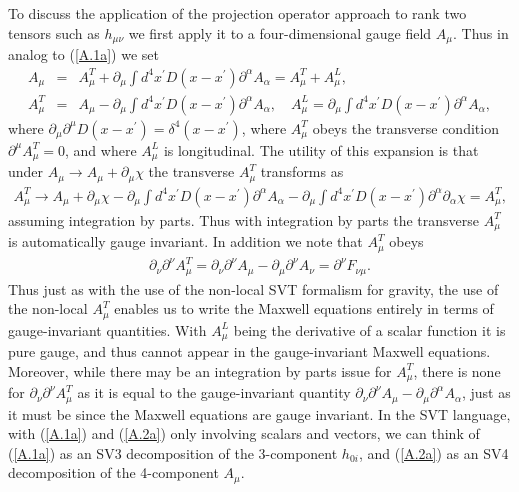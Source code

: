 \documentclass[aps,onecolumn,10pt]{revtex4}
\numberwithin{equation}{section}
\numberwithin{equation}{section}
\begin{document}
To discuss the application of the projection operator approach to rank two tensors such as $h_{\mu\nu}$ we first apply it to a four-dimensional gauge field $A_{\mu}$. Thus in analog to (\ref{A.1a}) we set
%
\begin{eqnarray}
A_{\mu}&=&A^T_{\mu}+\partial_{\mu}\int d^4x^{\prime}D(x-x^{\prime})\partial^{\alpha}A_{\alpha}=A^T_{\mu}+A^L_{\mu},
\nonumber\\
A^T_{\mu}&=&A_{\mu}-\partial_{\mu}\int d^4x^{\prime}D(x-x^{\prime})\partial^{\alpha}A_{\alpha},\quad A_{\mu}^L=\partial_{\mu}\int d^4x^{\prime}D(x-x^{\prime})\partial^{\alpha}A_{\alpha},
\label{A.2a}
\end{eqnarray}
%
where $\partial_{\mu}\partial^{\mu}D(x-x^{\prime})=\delta^4(x-x^{\prime})$, where $A^T_{\mu}$ obeys the transverse condition $\partial^{\mu}A^T_{\mu}=0$, and where $A_{\mu}^L$ is longitudinal. The utility of this expansion is that under  $A_{\mu}\rightarrow A_{\mu}+\partial_{\mu}\chi$ the transverse $A^T_{\mu}$ transforms as 
%
\begin{eqnarray}
A^T_{\mu}\rightarrow A_{\mu}+\partial_{\mu}\chi-\partial_{\mu}\int d^4x^{\prime}D(x-x^{\prime})\partial^{\alpha}A_{\alpha}
-\partial_{\mu}\int d^4x^{\prime}D(x-x^{\prime})\partial^{\alpha}\partial_{\alpha}\chi=A_{\mu}^T,
\label{A.3a}
\end{eqnarray}
%
assuming integration by parts. Thus with integration by parts the transverse $A^T_{\mu}$ is automatically gauge invariant. In addition we note that $A_{\mu}^T$ obeys 
%
\begin{eqnarray}
\partial_{\nu}\partial^{\nu}A^T_{\mu}=\partial_{\nu}\partial^{\nu}A_{\mu}-\partial_{\mu}\partial^{\nu}A_{\nu}=\partial^{\nu}F_{\nu\mu}.
\label{A.4a}
\end{eqnarray}
%
Thus just as with the use of the non-local SVT formalism for gravity, the use of the non-local $A_{\mu}^T$ enables us to write the Maxwell equations entirely in terms of gauge-invariant quantities. With $A_{\mu}^L$ being the derivative of a scalar function it is pure gauge, and thus cannot appear in the gauge-invariant Maxwell equations. Moreover, while there may be an integration by parts issue for $A_{\mu}^T$, there is none for $\partial_{\nu}\partial^{\nu}A^T_{\mu}$ as it is equal to the gauge-invariant quantity $\partial_{\nu}\partial^{\nu}A_{\mu}-\partial_{\mu}\partial^{\alpha}A_{\alpha}$, just as it must be since the Maxwell equations are gauge invariant.
In the SVT language, with (\ref{A.1a}) and (\ref{A.2a}) only involving scalars and vectors, we can think of (\ref{A.1a}) as an SV3 decomposition of the 3-component $h_{0i}$, and (\ref{A.2a}) as an SV4 decomposition of the 4-component $A_{\mu}$.
\end{document}

